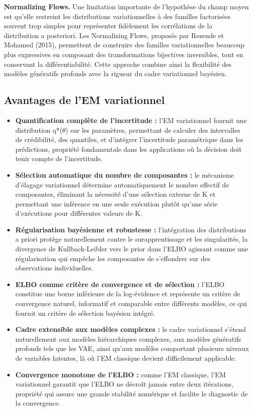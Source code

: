 \textbf{Normalizing Flows. }Une limitation importante de l'hypothèse du champ moyen est qu'elle restreint les distributions variationnelles à des familles factorisées souvent trop simples pour représenter fidèlement les corrélations de la distribution a posteriori. Les Normalizing Flows, proposés par Rezende et Mohamed (2015), permettent de construire des familles variationnelles beaucoup plus expressives en composant des transformations bijectives inversibles, tout en conservant la différentiabilité. Cette approche combine ainsi la flexibilité des modèles génératifs profonds avec la rigueur du cadre variationnel bayésien.

\subsection{Avantages de l'EM variationnel}
\begin{itemize}
\item \textbf{Quantification complète de l'incertitude : }l'EM variationnel fournit une distribution q*($\theta $) sur les paramètres, permettant de calculer des intervalles de crédibilité, des quantiles, et d'intégrer l'incertitude paramétrique dans les prédictions, propriété fondamentale dans les applications où la décision doit tenir compte de l'incertitude.
\item \textbf{Sélection automatique du nombre de composantes : }le mécanisme d'élagage variationnel détermine automatiquement le nombre effectif de composantes, éliminant la nécessité d'une sélection externe de K et permettant une inférence en une seule exécution plutôt qu'une série d'exécutions pour différentes valeurs de K.
\item \textbf{Régularisation bayésienne et robustesse : }l'intégration des distributions a priori protège naturellement contre le surapprentissage et les singularités, la divergence de Kullback-Leibler vers le prior dans l'ELBO agissant comme une régularisation qui empêche les composantes de s'effondrer sur des observations individuelles.
\item \textbf{ELBO comme critère de convergence et de sélection : }l'ELBO constitue une borne inférieure de la log-évidence et représente un critère de convergence naturel, informatif et comparable entre différents modèles, ce qui fournit un critère de sélection bayésien intégré.
\item \textbf{Cadre extensible aux modèles complexes : }le cadre variationnel s'étend naturellement aux modèles hiérarchiques complexes, aux modèles génératifs profonds tels que les VAE, ainsi qu'aux modèles comportant plusieurs niveaux de variables latentes, là où l'EM classique devient difficilement applicable.
\item \textbf{Convergence monotone de l'ELBO : }comme l'EM classique, l'EM variationnel garantit que l'ELBO ne décroît jamais entre deux itérations, propriété qui assure une grande stabilité numérique et facilite le diagnostic de la convergence.
\end{itemize}
